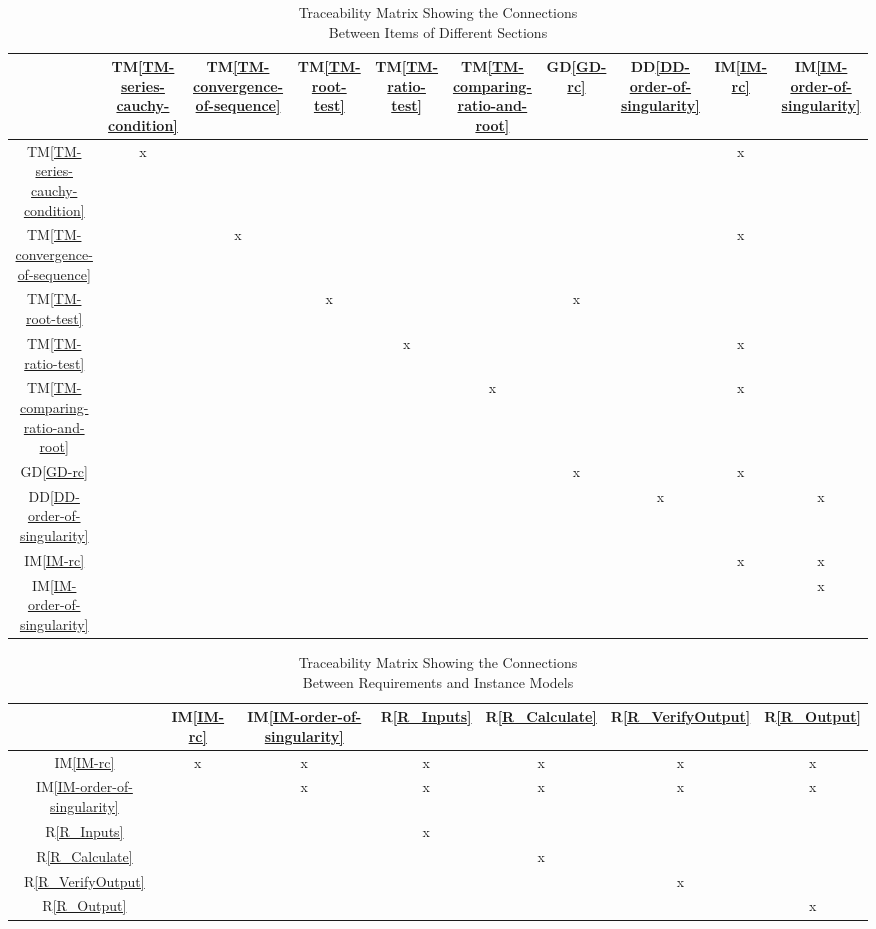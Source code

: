 \documentclass[12pt]{article}
\newcommand{\dref}[1]{GD\ref{#1}}
\newcommand{\ddref}[1]{DD\ref{#1}}
\newcommand{\tref}[1]{TM\ref{#1}}
\newcommand{\iref}[1]{IM\ref{#1}}
\newcommand{\rref}[1]{R\ref{#1}}
\begin{document}
\begin{table}[h!]
\centering
\begin{tabular}{|c|c|c|c|c|c|c|c|c|c|}
\hline        
	& \tref{TM-series-cauchy-condition} & \tref{TM-convergence-of-sequence} & \tref{TM-root-test} &
\tref{TM-ratio-test} & \tref{TM-comparing-ratio-and-root} & \dref{GD-rc} & \ddref{DD-order-of-singularity} &
\iref{IM-rc} & \iref{IM-order-of-singularity} \\
\hline
\tref{TM-series-cauchy-condition}  &x& & & & & & &x& \\ \hline
\tref{TM-convergence-of-sequence}  & &x& & & & & &x& \\ \hline
\tref{TM-root-test}                & & &x& & &x& & & \\ \hline
\tref{TM-ratio-test}               & & & &x& & & &x& \\ \hline
\tref{TM-comparing-ratio-and-root} & & & & &x& & &x& \\ \hline
\dref{GD-rc}                       & & & & & &x& &x& \\ \hline
\ddref{DD-order-of-singularity}    & & & & & & &x& &x\\ \hline
\iref{IM-rc}                       & & & & & & & &x&x\\ \hline
\iref{IM-order-of-singularity}     & & & & & & & & &x\\
\hline
\end{tabular}
\caption{Traceability Matrix Showing the Connections\\Between Items of Different Sections}
\label{Table:trace}
\end{table}

\begin{table}[h!]
\centering
\begin{tabular}{|c|c|c|c|c|c|c|}
\hline
	& \iref{IM-rc} & \iref{IM-order-of-singularity} & \rref{R_Inputs} & \rref{R_Calculate} & \rref{R_VerifyOutput} & \rref{R_Output} \\
\hline
\iref{IM-rc}                   &x&x&x&x&x&x \\ \hline
\iref{IM-order-of-singularity} & &x&x&x&x&x \\ \hline
\rref{R_Inputs}                & & &x& & &  \\ \hline
\rref{R_Calculate}             & & & &x& &  \\ \hline
\rref{R_VerifyOutput}          & & & & &x&  \\ \hline
\rref{R_Output}                & & & & & &x \\
\hline
\end{tabular}
\caption{Traceability Matrix Showing the Connections\\Between Requirements and Instance Models}
\label{Table:R_trace}
\end{table}
\end{document}
